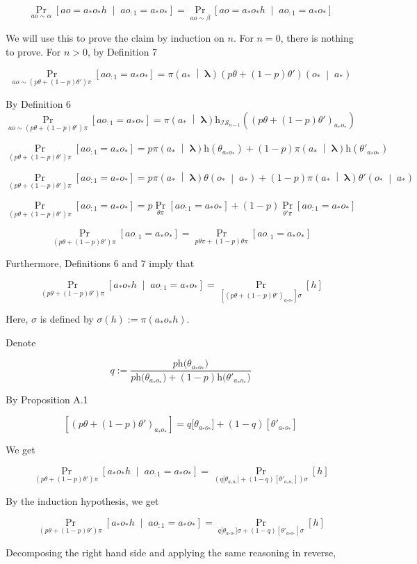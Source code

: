 \documentclass[a4paper]{article}
\newcommand{\AP}[1]{\left(#1\right)}
\newcommand{\AB}[1]{\left[#1\right]}
\newcommand{\APM}[2]{\left(#1\;\middle\vert\;#2\right)}
\newcommand{\ABM}[2]{\left[#1\;\middle\vert\;#2\right]}
\newcommand{\Pa}[2]{\underset{#1}{\operatorname{Pr}}\AB{#2}}
\newcommand{\CP}[3]{\underset{#1}{\operatorname{Pr}}\ABM{#2}{#3}}
\newcommand{\Estr}{\boldsymbol{\lambda}} %
\newcommand{\Ht}{\mathrm{h}}
\newcommand{\IS}{\mathcal{IS}}
\begin{document}
$$\CP{ao\sim\alpha}{ao=a_*o_*h}{ao_{:1}=a_*o_*}=\CP{ao\sim\beta}{ao=a_*o_*h}{ao_{:1}=a_*o_*}$$

We will use this to prove the claim by induction on $n$. For $n=0$, there is nothing to prove. For $n>0$, by Definition 7

$$\Pa{ao\sim\AP{p\theta+(1-p)\theta'}\pi}{ao_{:1}=a_*o_*}=\pi\APM{a_*}{\Estr}\AP{p\theta+(1-p)\theta'}\APM{o_*}{ a_*}$$

By Definition 6
$$\Pa{ao\sim\AP{p\theta+(1-p)\theta'}\pi}{ao_{:1}=a_*o_*}=\pi\APM{a_*}{\Estr}\Ht_{\IS_{n-1}}\AP{\AP{p\theta+(1-p)\theta'}_{a_*o_*}}$$

$$\Pa{\AP{p\theta+(1-p)\theta'}\pi}{ao_{:1}=a_*o_*}=p\pi\APM{a_*}{\Estr}\Ht\AP{\theta_{a_*o_*}}+(1-p)\pi\APM{a_*}{\Estr}\Ht\AP{\theta'_{a_*o_*}}$$

$$\Pa{\AP{p\theta+(1-p)\theta'}\pi}{ao_{:1}=a_*o_*}=p\pi\APM{a_*}{\Estr}\theta\APM{o_*}{a_*}+(1-p)\pi\APM{a_*}{\Estr}\theta'\APM{o_*}{a_*}$$

$$\Pa{\AP{p\theta+(1-p)\theta'}\pi}{ao_{:1}=a_*o_*}=p\Pa{\theta\pi}{ao_{:1}=a_*o_*}+(1-p)\Pa{\theta'\pi}{ao_{:1}=a_*o_*}$$

$$\Pa{\AP{p\theta+(1-p)\theta'}\pi}{ao_{:1}=a_*o_*}=\Pa{p\theta\pi+(1-p)\theta\pi}{ao_{:1}=a_*o_*}$$

Furthermore, Definitions 6 and 7 imply that

$$\CP{\AP{p\theta+(1-p)\theta'}\pi}{a_*o_*h}{ao_{:1}=a_*o_*}=\Pa{\AB{\AP{p\theta+(1-p)\theta'}_{a_*o_*}}\sigma}{h}$$

Here, $\sigma$ is defined by $\sigma(h):=\pi\AP{a_*o_*h}$. 

Denote

$$q:=\frac{p\Ht\big(\theta_{a_*o_*}\big)}{p\Ht\big(\theta_{a_*o_*}\big)+(1-p)\Ht\big(\theta'_{a_*o_*}\big)}$$

By Proposition A.1

$$\AB{\AP{p\theta+(1-p)\theta'}_{a_*o_*}}=q\big[\theta_{a_*o_*}\big]+(1-q)\AB{\theta'_{a_*o_*}}$$


We get

$$\CP{\AP{p\theta+(1-p)\theta'}\pi}{a_*o_*h}{ao_{:1}=a_*o_*}=\Pa{\AP{q\big[\theta_{a_*o_*}\big]+(1-q)\AB{\theta'_{a_*o_*}}}\sigma}{h}$$

By the induction hypothesis, we get

$$\CP{\AP{p\theta+(1-p)\theta'}\pi}{a_*o_*h}{ao_{:1}=a_*o_*}=\Pa{q\big[\theta_{a_*o_*}\big]\sigma+(1-q)\AB{\theta'_{a_*o_*}}\sigma}{h}$$

Decomposing the right hand side and applying the same reasoning in reverse,
\end{document}
